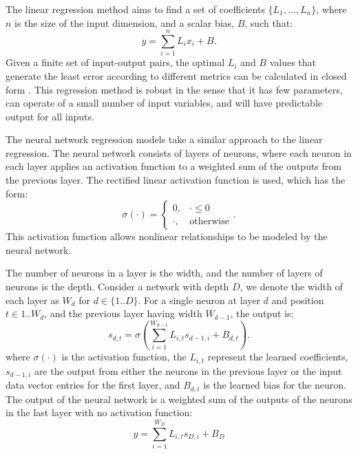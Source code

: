 The linear regression method aims to find 
a set of coefficients $\{L_1, \ldots, L_n\}$, where $n$ is the size of the input dimension,
and a scalar bias, $B$, such that:
\begin{equation}
y = \sum_{i=1}^{n} L_i x_i + B.
\end{equation}
Given a finite set of input-output pairs, 
the optimal $L_i$ and $B$ values that generate the least error
according to different metrics can be calculated in closed form \cite{Maulud2020}.
This regression method is robust in the sense that it has few parameters, can operate of a small number of
input variables, and will have predictable output for all inputs.

The neural network regression models take a similar approach to the linear regression.
The neural network consists of layers of neurons, where each neuron in each layer
applies an activation function to a weighted sum of the outputs from the previous layer.
The rectified linear activation function \cite{Hu2019} is used, which has the form:
\begin{equation}
\sigma(\cdot) = \begin{cases} 
0, &\cdot \leq 0 \\ \cdot, &\mathrm{otherwise} \end{cases} .
\end{equation}
This activation function allows nonlinear relationships to be modeled by the neural network.

The number of neurons in a layer is the width, and the number of layers of neurons is the depth.
Consider a network with depth $D$, we denote the width of each layer as $W_d$ for $d \in \{1..D\}$.
For a single neuron at layer $d$ and position $t \in {1..W_d}$,
 and the previous layer having width $W_{d-1}$, the output is:
\begin{equation}
s_{d,t} = \sigma( \sum_{i=1}^{W_{d-1}} L_{i,t} s_{d-1,i} + B_{d,t} ).
\end{equation}
where $\sigma(\cdot)$ is the activation function, the $L_{i,t}$ represent the
learned coefficients, $s_{d-1,i}$ are the output from either the neurons in the previous layer 
or the input data vector entries for the first layer,
and $B_{d,t}$  is the learned bias for the neuron. 
The output of the neural network is a weighted sum of the outputs 
of the neurons in the last layer with no activation function:
\begin{equation}
y = \sum_{i=1}^{W_D} L_{i,t} s_{D,i} + B_D
\end{equation}


